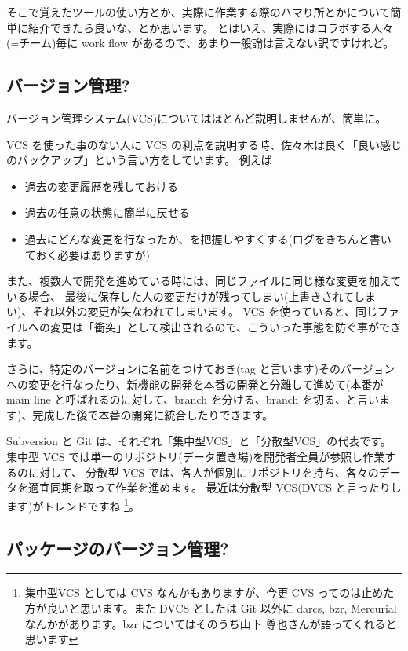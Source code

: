 \documentclass[mingoth,a4paper]{jsarticle}
\begin{document}
そこで覚えたツールの使い方とか、実際に作業する際のハマり所とかについて簡単に紹介できたら良いな、とか思います。
とはいえ、実際にはコラボする人々(=チーム)毎に work flow があるので、あまり一般論は言えない訳ですけれど。

\subsection{バージョン管理?}

バージョン管理システム(VCS)についてはほとんど説明しませんが、簡単に。

VCS を使った事のない人に VCS の利点を説明する時、佐々木は良く「良い感じのバックアップ」という言い方をしています。
例えば
\begin{itemize}
\item 過去の変更履歴を残しておける
\item 過去の任意の状態に簡単に戻せる
\item 過去にどんな変更を行なったか、を把握しやすくする(ログをきちんと書いておく必要はありますが)
\end{itemize}

また、複数人で開発を進めている時には、同じファイルに同じ様な変更を加えている場合、
最後に保存した人の変更だけが残ってしまい(上書きされてしまい)、それ以外の変更が失なわれてしまいます。
VCS を使っていると、同じファイルへの変更は「衝突」として検出されるので、こういった事態を防ぐ事ができます。

さらに、特定のバージョンに名前をつけておき(tag と言います)そのバージョンへの変更を行なったり、新機能の開発を本番の開発と分離して進めて(本番が main line と呼ばれるのに対して、branch を分ける、branch を切る、と言います)、完成した後で本番の開発に統合したりできます。

Subversion と Git は、それぞれ「集中型VCS」と「分散型VCS」の代表です。
集中型 VCS では単一のリポジトリ(データ置き場)を開発者全員が参照し作業するのに対して、
分散型 VCS では、各人が個別にリポジトリを持ち、各々のデータを適宜同期を取って作業を進めます。
最近は分散型 VCS(DVCS と言ったりします)がトレンドですね%
\footnote{集中型VCS としては CVS なんかもありますが、今更 CVS ってのは止めた方が良いと思います。また DVCS としたは Git 以外に darcs, bzr, Mercurial なんかがあります。bzr についてはそのうち山下 尊也さんが語ってくれると思います}。

\subsection{パッケージのバージョン管理?}
\end{document}
